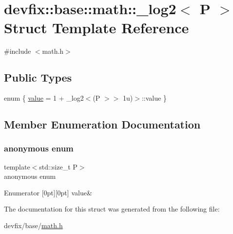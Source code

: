 \hypertarget{structdevfix_1_1base_1_1math_1_1__log2}{}\section{devfix\+:\+:base\+:\+:math\+:\+:\+\_\+log2$<$ P $>$ Struct Template Reference}
\label{structdevfix_1_1base_1_1math_1_1__log2}


{\ttfamily \#include $<$math.\+h$>$}

\subsection*{Public Types}
\begin{DoxyCompactItemize}
\item 
enum \{ \hyperlink{structdevfix_1_1base_1_1math_1_1__log2_a365a70e975843305e3c66d0a19ef3206ae740447541efc4f84384df3ffa370947}{value} = 1 + \+\_\+log2$<$(P $>$$>$ 1u)$>$\+:\+:value
 \}
\end{DoxyCompactItemize}


\subsection{Member Enumeration Documentation}
\mbox{\label{structdevfix_1_1base_1_1math_1_1__log2_a365a70e975843305e3c66d0a19ef3206}} 
\subsubsection{\texorpdfstring{anonymous enum}{anonymous enum}}
{\footnotesize\ttfamily template$<$std\+::size\+\_\+t P$>$ \\
anonymous enum}

\begin{DoxyEnumFields}{Enumerator}
[0pt][0pt]{}\mbox{\label{structdevfix_1_1base_1_1math_1_1__log2_a365a70e975843305e3c66d0a19ef3206ae740447541efc4f84384df3ffa370947}} 
value&\\
\hline

\end{DoxyEnumFields}


The documentation for this struct was generated from the following file\+:\begin{DoxyCompactItemize}
\item 
devfix/base/\hyperlink{math_8h}{math.\+h}\end{DoxyCompactItemize}
